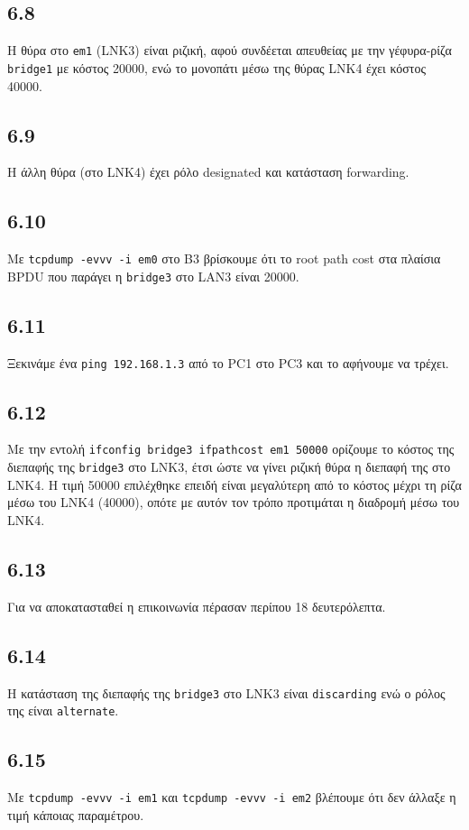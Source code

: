 \documentclass[a4paper, 12pt]{article}
\begin{document}
	\subsection*{6.8}
		Η θύρα στο \verb|em1| (LNK3) είναι ριζική, αφού συνδέεται απευθείας με την γέφυρα-ρίζα \verb|bridge1| με κόστος 20000, ενώ το μονοπάτι μέσω της θύρας LNK4 έχει κόστος 40000.  

	\subsection*{6.9}
		Η άλλη θύρα (στο LNK4) έχει ρόλο designated και κατάσταση forwarding.

	\subsection*{6.10}
		Με \verb|tcpdump -evvv -i em0| στο B3 βρίσκουμε ότι το root path cost στα πλαίσια BPDU που παράγει η \verb|bridge3| στο LAN3 είναι 20000.

	\subsection*{6.11}
		Ξεκινάμε ένα \verb|ping 192.168.1.3| από το PC1 στο PC3 και το αφήνουμε να τρέχει.

	\subsection*{6.12}
		Με την εντολή \verb|ifconfig bridge3 ifpathcost em1 50000| ορίζουμε το κόστος της διεπαφής της \verb|bridge3| στο LNK3, έτσι ώστε να γίνει ριζική θύρα η διεπαφή της στο LNK4. Η τιμή 50000 επιλέχθηκε επειδή είναι μεγαλύτερη από το κόστος μέχρι τη ρίζα μέσω του LNK4 (40000), οπότε με αυτόν τον τρόπο προτιμάται η διαδρομή μέσω του LNK4.

	\subsection*{6.13}
		Για να αποκατασταθεί η επικοινωνία πέρασαν περίπου 18 δευτερόλεπτα.

	\subsection*{6.14}
		Η κατάσταση της διεπαφής της \verb|bridge3| στο LNK3 είναι \verb|discarding| ενώ ο ρόλος της είναι \verb|alternate|.

	\subsection*{6.15}
		Με \verb|tcpdump -evvv -i em1| και \verb|tcpdump -evvv -i em2| βλέπουμε ότι δεν άλλαξε η τιμή κάποιας παραμέτρου.
\end{document}
